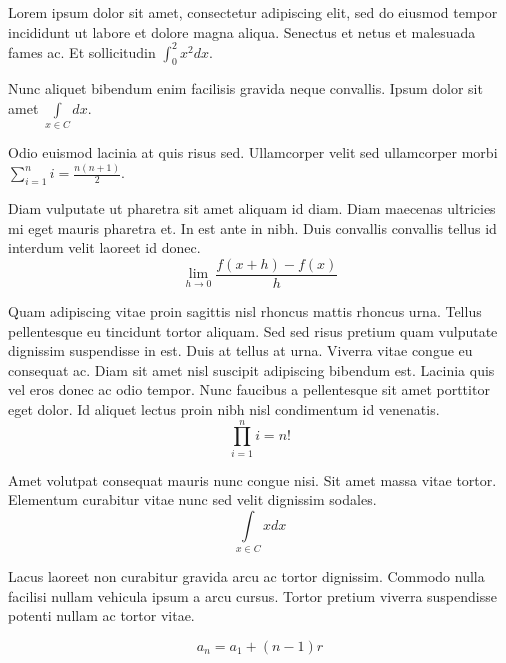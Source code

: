 \documentclass{article}
\begin{document}
Lorem ipsum dolor sit amet, consectetur adipiscing elit, sed do eiusmod tempor incididunt ut labore et dolore magna aliqua. Senectus et netus et malesuada fames ac. Et sollicitudin \begin{math}
	\int_0^2x^2dx
\end{math}.\newline
 
Nunc aliquet bibendum enim facilisis gravida neque convallis. Ipsum dolor sit amet $ \int\limits_{x\in C}dx $.\newline
    
Odio euismod lacinia at quis risus sed. Ullamcorper velit sed ullamcorper morbi \( \sum_{i=1}^{n}i=\frac{n(n+1)}{2} \).\newline

Diam vulputate ut pharetra sit amet aliquam id diam. Diam maecenas ultricies mi eget mauris pharetra et. In est ante in nibh. Duis convallis convallis tellus id interdum velit laoreet id donec. 
\[ \lim_{h\to 0}\frac{f(x+h)-f(x)}{h} \]

Quam adipiscing vitae proin sagittis nisl rhoncus mattis rhoncus urna. Tellus pellentesque eu tincidunt tortor aliquam. Sed sed risus pretium quam vulputate dignissim suspendisse in est. Duis at tellus at urna. Viverra vitae congue eu consequat ac. Diam sit amet nisl suscipit adipiscing bibendum est. Lacinia quis vel eros donec ac odio tempor. Nunc faucibus a pellentesque sit amet porttitor eget dolor. Id aliquet lectus proin nibh nisl condimentum id venenatis.
$$ \prod_{i=1}^ni=n! $$

Amet volutpat consequat mauris nunc congue nisi. Sit amet massa vitae tortor. Elementum curabitur vitae nunc sed velit dignissim sodales. 
\begin{displaymath}
	\int\limits_{x\in C}xdx
\end{displaymath}

Lacus laoreet non curabitur gravida arcu ac tortor dignissim. Commodo nulla facilisi nullam vehicula ipsum a arcu cursus. Tortor pretium viverra suspendisse potenti nullam ac tortor vitae. 

\begin{equation}
	a_{n}=a_{1}+(n-1)r
\end{equation}
\end{document}
